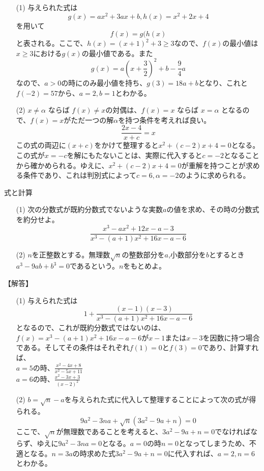 \documentclass[a4paper,fleqn,dvipdfmx]{jsarticle}
\begin{document}
\begin{itemize}
    \item [(1)] 与えられた式は
    $$g(x)=ax^2+3ax+b,h(x)=x^2+2x+4$$
    を用いて
    $$f(x)=g(h(x)$$
    と表される。ここで、$h(x)=(x+1)^2+3\geq 3$なので、$f(x)$の最小値は$x\geq 3$における$g(x)$の最小値である。また
    $$g(x)=a\left(x+\frac{3}{2}\right)^2+b-\frac{9}{4}a$$
    なので、$a>0$の時にのみ最小値を持ち、$g(3)=18a+b$となり、これと$f(-2)=57$から、$a=2,b=1$とわかる。
    \item [(2)] $x \neq \alpha$ ならば $f(x) \neq x$の対偶は、$f(x)=x$ ならば $x=\alpha$ となるので、$f(x)=x$がただ一つの解$\alpha$を持つ条件を考えれば良い。
    $$\frac{2x-4}{x+c}=x$$
    この式の両辺に$(x+c)$をかけて整理すると$x^2+(c-2)x+4=0$となる。この式が$x=-c$を解にもたないことは、実際に代入すると$c=-2$となることから確かめられる。ゆえに、$x^2+(c-2)x+4=0$が重解を持つことが求める条件であり、これは判別式によって$c=6,\alpha=-2$のように求められる。
    
\end{itemize}



\newpage
\begin{itembox}[l]{式と計算}
\begin{itemize}
    \item [(1)] 次の分数式が既約分数式でないような実数$a$の値を求め、その時の分数式を約分せよ。
    $$\frac{x^3-ax^2+12x-a-3}{x^3-(a+1)x^2+16x-a-6}$$
    \item [(2)] $n$を正整数とする。無理数$\sqrt{n}$の整数部分を$a$,小数部分を$b$とするとき$a^3-9ab+b^3=0$であるという。$n$をもとめよ。
\end{itemize}
\end{itembox}

\begin{flushleft}
【解答】
\end{flushleft}

\begin{itemize}
    \item [(1)] 与えられた式は
    $$1+\frac{(x-1)(x-3)}{x^3-(a+1)x^2+16x-a-6}$$
    となるので、これが既約分数式ではないのは、$f(x)=x^3-(a+1)x^2+16x-a-6$が$x-1$または$x-3$を因数に持つ場合である。そしてその条件はそれぞれ$f(1)=0$と$f(3)=0$であり、計算すれば、\\
    $a=5$の時、$\displaystyle\frac{x^2-4x+8}{x^2-5x+11}$\\
    $a=6$の時、$\displaystyle\frac{x^2-3x+3}{(x-2)^2}$
    \item [(2)] $b=\sqrt{n}-a$を与えられた式に代入して整理することによって次の式が得られる。$$9a^2-3na+\sqrt{n}(3a^2-9a+n)=0$$ここで、$\sqrt{n}$が無理数であることを考えると、$3a^2-9a+n=0$でなければならず、ゆえに$9a^2-3na=0$となる。$a=0$の時$n=0$となってしまうため、不適となる。$n=3a$の時求めた式$3a^2-9a+n=0$に代入すれば、$a=2,n=6$とわかる。
    
\end{itemize}
\end{document}
